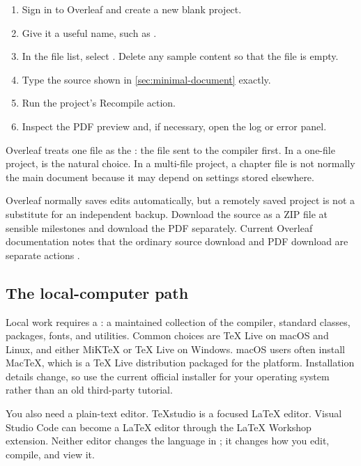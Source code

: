 \begin{enumerate}
  \item Sign in to Overleaf and create a new blank project.
  \item Give it a useful name, such as .
  \item In the file list, select . Delete any sample content so
        that the file is empty.
  \item Type the source shown in \cref{sec:minimal-document} exactly.
  \item Run the project's Recompile action.
  \item Inspect the PDF preview and, if necessary, open the log or error panel.
\end{enumerate}

Overleaf treats one  file as the : the file sent
to the compiler first. In a one-file project,  is the natural
choice. In a multi-file project, a chapter file is not normally the main
document because it may depend on settings stored elsewhere.

\begin{classroomnote}
Overleaf normally saves edits automatically, but a remotely saved project is
not a substitute for an independent backup. Download the source as a ZIP file
at sensible milestones and download the PDF separately. Current Overleaf
documentation notes that the ordinary source download and PDF download are
separate actions \parencite{overleafDownload}.
\end{classroomnote}

\subsection{The local-computer path}

Local work requires a : a maintained collection of the
compiler, standard classes, packages, fonts, and utilities. Common choices are
TeX Live on macOS and Linux, and either MiKTeX or TeX Live on Windows. macOS
users often install MacTeX, which is a TeX Live distribution packaged for the
platform. Installation details change, so use the current official installer
for your operating system rather than an old third-party tutorial.

You also need a plain-text editor. TeXstudio is a focused \LaTeX{} editor. Visual
Studio Code can become a \LaTeX{} editor through the \LaTeX{} Workshop extension.
Neither editor changes the language in ; it changes how you
edit, compile, and view it.

